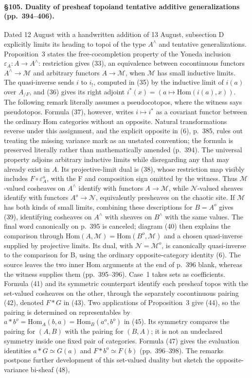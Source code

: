 \paragraph{\S105. Duality of presheaf topoi\newline and tentative additive generalizations (pp.\ 394--406).}
Dated 12 August with a handwritten addition of 13 August, subsection D explicitly limits its heading to topoi of the type $A^\wedge$ and tentative generalizations. Proposition~3 states the free-cocompletion property of the Yoneda inclusion $\varepsilon_A:A\to A^\wedge$: restriction gives (33), an equivalence between cocontinuous functors $A^\wedge\to\mathcal M$ and arbitrary functors $A\to\mathcal M$, when $\mathcal M$ has small inductive limits. The quasi-inverse sends $i$ to $i_!$, computed in (35) by the inductive limit of $i(a)$ over $A_{/F}$, and (36) gives its right adjoint $i^*(x)=(a\mapsto\mathrm{Hom}(i(a),x))$. The following remark literally assumes a pseudocotopos, where the witness says pseudotopos. Formula (37), however, writes $i\mapsto i^*$ as a covariant functor between the ordinary Hom categories without an opposite. Natural transformations reverse under this assignment, and the explicit opposite in (6), p.\ 385, rules out treating the missing variance mark as an unstated convention; the formula is preserved literally rather than mathematically amended (p.\ 394). The universal property adjoins arbitrary inductive limits while disregarding any that may already exist in $A$. Its projective-limit dual is (38), whose restriction map visibly includes $F\circ\varepsilon_A^o$, with the F and composition sign omitted by the witness. Thus $\mathcal M$-valued cosheaves on $A^\wedge$ identify with functors $A\to\mathcal M$, while $\mathcal N$-valued sheaves identify with functors $A^o\to\mathcal N$, equivalently presheaves on the chaotic site. If $\mathcal M$ has both kinds of small limits, combining these descriptions for $B=A^o$ gives (39), identifying cosheaves on $A^\wedge$ with sheaves on $B^\wedge$ with the same values. The final word canonically on p.\ 395 is canceled; diagram (40) then explains the comparison through $\mathrm{Hom}(A,\mathcal M)=\mathrm{Hom}(B^o,\mathcal M)$ and a chosen quasi-inverse supplied by projective limits. Its dual, with $\mathcal N=\mathcal M^o$, is canonically quasi-inverse to the comparison for B, using the ordinary opposite-category identity (6). The source leaves the two inner Hom arguments at the end of p.\ 396 blank, whereas the witness supplies them (pp.\ 395--396). Case~1 takes sets as coefficients. Formula (41) and its symmetric counterpart identify each presheaf topos with the set-valued cosheaves on the other, through the separately cocontinuous pairing (42), denoted $F*G$ in (43). Two applications of Proposition~3 give (44), so the pairing is determined on representables by $a*b^o=\mathrm{Hom}_A(b,a)=\mathrm{Hom}_B(a^o,b^o)$ in (45). Its symmetry compares the pairing for $(A,B)$ with the pairing for $(B,A)$; it is not an undeclared symmetry inside one fixed pair of categories. Formula (47) gives the evaluation identities $a*G\simeq G(a)$ and $F*b^o\simeq F(b)$ (pp.\ 396--398). The remarks postpone further development of this set-valued duality but sketch the opposite-variance bi-sheaf (48), 